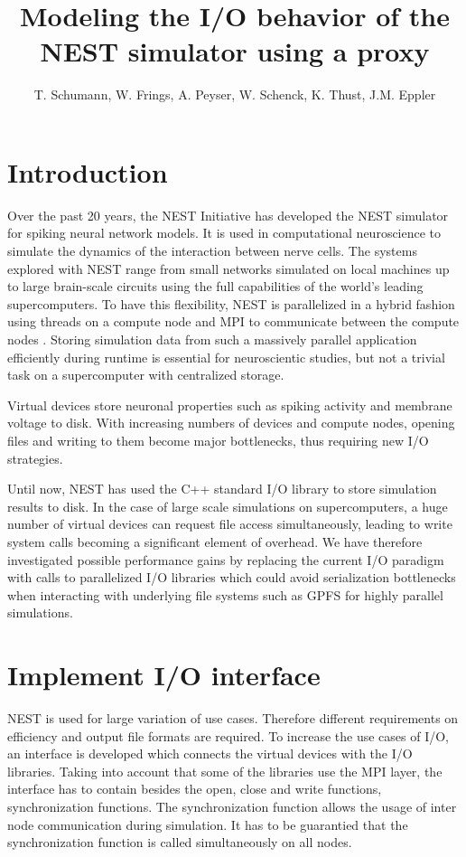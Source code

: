 \documentclass[]{YIC2015}
\title{Modeling the I/O behavior of the NEST simulator using a proxy}
\author[T. Schumann et al.]{%
  T. Schumann\authref{a}\corref,
  W. Frings\authref{b},
  A. Peyser\authref{c},
  W. Schenck\authref{c},
  K. Thust\authref{b},
  J.M. Eppler\authref{c}
}
\begin{document}
\maketitle

\section{Introduction}
%
Over the past 20 years, the NEST Initiative \cite{NESTInitiative} has developed the NEST
\cite{NEST} simulator for spiking neural network models. It is used in
computational neuroscience to simulate the dynamics of the interaction
between nerve cells. The systems explored with NEST range from small
networks simulated on local machines up to large brain-scale circuits
using the full capabilities of the world's leading supercomputers. To
have this flexibility, NEST is parallelized in a hybrid fashion
using threads on a compute node and MPI to communicate between the
compute nodes \cite{Plesser07}.  Storing simulation data from such a
massively parallel application efficiently during runtime is essential
for neuroscientic studies, but not a trivial task on a supercomputer
with centralized storage.

Virtual devices store neuronal properties such as spiking activity
and membrane voltage to disk. With increasing numbers of devices and
compute nodes, opening files and writing to them become major bottlenecks, thus requiring
new I/O strategies.

Until now, NEST has used the C++ standard I/O library to store
simulation results to disk.  In the case of large scale simulations on
supercomputers, a huge number of virtual devices can request file
access simultaneously, leading to write system calls becoming a
significant element of overhead. We have therefore investigated
possible performance gains by replacing the current I/O paradigm with
calls to parallelized I/O libraries which could avoid serialization
bottlenecks when interacting with underlying file systems such as GPFS
\cite{GPFS} for highly parallel simulations.

\section{Implement I/O interface}
NEST is used for large variation of use cases.
Therefore different requirements on efficiency and output file formats are required.
To increase the use cases of I/O, an interface is developed which connects the virtual devices with the I/O libraries.
Taking into account that some of the libraries use the MPI layer,
the interface has to contain besides the open, close and write functions, synchronization functions.
The synchronization function allows the usage of inter node communication during simulation.
It has to be guarantied that the synchronization function is called simultaneously on all nodes.
\end{document}
